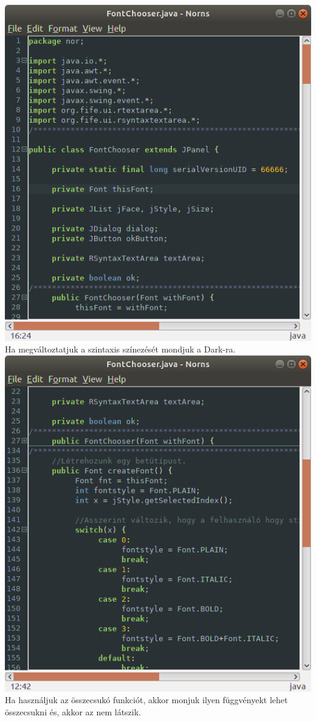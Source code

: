 \documentclass[12pt]{article}
\begin{document}
\includegraphics[width = \textwidth]{DarkSyntax}
Ha megváltoztatjuk a szintaxis színezését mondjuk a Dark-ra. \\

\includegraphics[width = \textwidth]{Folding}
Ha használjuk az összecsukó funkciót, akkor monjuk ilyen függvényekt lehet
összecsukni és, akkor az nem látszik.
\end{document}
